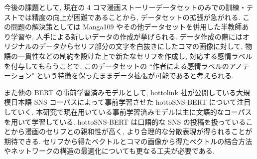 \documentclass[twocolumn]{jarticle}     %
\begin{document}
今後の課題として, 現在の 4 コマ漫画ストーリーデータセットのみでの訓練・テストでは精度の向上が困難であることから, データセットの拡張が急がれる. この問題の解決策としては Manga109 やその他データセットを併用した半教師あり学習や, 人手による新しいデータの作成が挙げられる. データ作成の際にはオリジナルのデータからセリフ部分の文字を白抜きにしたコマの画像に対して, 物語の一貫性などの制約を設けた上で新たなセリフを作成し, 対応する感情ラベルを付与してもらうことで, このデータセットの ``作者による感情ラベルのアノテーション" という特徴を保ったままデータ拡張が可能であると考えられる.

また他の BERT の事前学習済みモデルとして, hottolink 社が公開している大規模日本語 SNS コーパスによって事前学習させた hottoSNS-BERT \cite{hottoSNS-bert} について注目していく. 本研究で現在用いている事前学習済みモデルは主に文語的なコーパスを用いて学習している. hottoSNS-BERT は口語的な SNS の投稿を扱っていることから漫画のセリフとの親和性が高く, より合理的な分散表現が得られることが期待できる. セリフから得たベクトルとコマの画像から得たベクトルの結合方法やネットワークの構造の最適化についても更なる工夫が必要である.


\begin{table}[!b]
\begin{center}
\caption{実験 1 の結果(評価用データ)}
\label{table:result_1}
\end{center}
\end{table}
\end{document}
